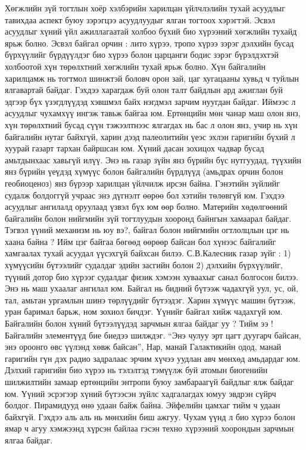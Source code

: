 Хөгжлийн зүй тогтлын хоёр хэлбэрийн харилцан үйлчлэлийн тухай асуудлыг тавихдаа аспект буюу зэрэгцээ асуудлуудыг ялган тогтоох хэрэгтэй. Эсвэл асуудлыг хүний үйл ажиллагаатай холбоо бүхий био хүрээний хөгжлийн тухайд ярьж болно. Эсвэл байгал орчин : лито хүрээ, тропо хүрээ зэрэг дэлхийн бусад бүрхүүлийг бүрдүүлдэг био хүрээ болон царцанги бодис зэрэг бүрэлдэхтэй холбоотой хүн төрөлхтний хөгжлийн тухай ярьж болно. Хүн байгалийн харилцамж нь тогтмол шинжтэй боловч орон зай, цаг хугацааны хувьд ч туйлын ялгавартай байдаг. Гэхдээ харагдаж буй олон талт байдлын ард ажиглан буй эдгээр бүх үзэгдлүүдэд хэвшмэл байх нэгдмэл зарчим нуугдан байдаг. Иймээс л асуудлыг чухамхүү ингэж тавьж байгаа юм.
Ертөнцийн мөн чанар маш олон янз, хүн төрөлхтний бусад сүүн тэжээлтнээс ялгагдах нь бас л олон янз, учир нь хүн байгалийн нутаг байхгүй, харин дээд палеолитийн үеэс эхлэн гаригийн бүхий л хуурай газарт тархан байршсан юм. Хүний дасан зохицох чадвар бусад амьтдынхаас хавьгүй илүү. Энэ нь газар зүйн янз бүрийн бүс нутгуудад, түүхийн янз бүрийн үеүдэд хүмүүс болон байгалийн бүрдлүүд (амьдрах орчин болон геобиоценоз) янз бүрээр харилцан үйлчилж ирсэн байна. Гэнэтийн зүйлийг судалж болдоггүй учраас энэ дүгнэлт өөрөө бол хэтийн төлөвгүй юм. Гэхдээ асуудлыг ангилалд оруулаад үзвэл бүх юм өөр болно. Материйн хөдөлгөөний байгалийн болон нийгмийн зүй тогтлуудын хооронд байнгын хамаарал байдаг. Тэгвэл үүний механизм нь юу вэ?, байгал болон нийгмийн огтлолцлын цэг нь хаана байна ? Ийм цэг байгаа бөгөөд өөрөөр байсан бол хүнээс байгалийг хамгаалах тухай асуудал үүсэхгүй байхсан билээ.
С.В.Калесник газар зүйг : 1) хүмүүсийн бүтээлийг судалдаг эдийн засгийн болон 2) дэлхийн бүрхүүлийг, түүний дотор био хүрээг судалдаг физик хэмээн хуваахыг санал болгосон билээ. Энэ нь маш ухаалаг ангилал юм. Байгал нь бидний бүтээж чадахгүй уул, ус, ой, тал, амьтан ургамлын шинэ төрлүүдийг бүтээдэг. Харин хүмүүс машин бүтээж, уран баримал барьж, ном зохиол бичдэг. Үүнийг байгал хийж чадахгүй юм.
Байгалийн болон хүний бүтээлүүдэд зарчмын ялгаа байдаг уу ? Тийм ээ ! Байгалийн элементүүд бие биедээ шилждэг. “Энэ чулуу эрт цагт дуугарч байсан, энэ ороонго өвс үүлэнд хөвж байсан”, Нар, манай Галактикийн одод, манай гаригийн гүн дэх радио задралаас эрчим хүчээ уудлан авч мөнхөд амьдардаг юм.
Дэлхий гаригийн био хүрээ нь тэлэлтэд тэмүүлж буй атомын биогенийн шилжилтийн замаар ертөнцийн энтропи буюу замбараагүй байдлыг ялж байдаг юм. Үүний эсрэгээр хүний бүтээсэн зүйлс хадгалагдах юмуу эвдрэн сүйрч болдог. Пирамидууд өнө удаан байж байна. Эйфелийн цамхаг тийм ч удаан байхгүй. Гэхдээ аль аль нь мөнхийн биш ажгуу. Чухам үүнд л био хүрээ болон ямар ч агуу хэмжээнд хүрсэн байлаа гэсэн техно хүрээний хоорондын зарчмын ялгаа байдаг.

